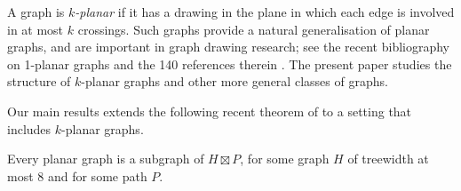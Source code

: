 \documentclass{patmorin}
\newcommand{\note}[2]{{\color{red}[#1:~#2]}}
\newcommand{\notex}[2]{}
\renewcommand{\le}{\leqslant}
\begin{document}
A graph is \emph{$k$-planar} if it has a drawing in the plane in which each edge is involved in at most $k$ crossings. Such graphs provide a natural generalisation of planar graphs, and are important in graph drawing research; see the recent bibliography on 1-planar graphs and the 140 references therein \citep{kobourov.liotta.ea:annotated}. The present paper studies the structure of $k$-planar graphs and other more general classes of graphs. 
\notex{PM}{I removed the following sentences because neither Vida nor could find anything about $k$-planar graphs in \cite{FP08} and, in any case, the proof is easy.  This could easily upset a referee.
Various structural results about planar graphs generalise for $k$-planar graphs. For example, \citet{FP08} generalised the Lipton-Tarjan separator theorem to show that every $k$-planar graph with $n$ vertices has a balanced separator of order $O(\sqrt{kn})$.}

Our main results extends the following recent theorem of \citet{dujmovic.joret.ea:planar} to a setting that includes $k$-planar graphs.

\begin{thm} 
\label{PlanarBasic}
Every planar graph is a subgraph of $H\boxtimes P$, for some graph $H$ of treewidth at most $8$ and for some path $P$. 
\end{thm}
\end{document}

